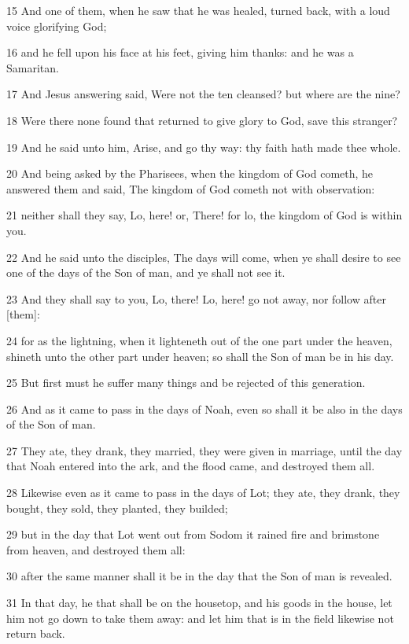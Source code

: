 \par 15 And one of them, when he saw that he was healed, turned back, with a loud voice glorifying God;
\par 16 and he fell upon his face at his feet, giving him thanks: and he was a Samaritan.
\par 17 And Jesus answering said, Were not the ten cleansed? but where are the nine?
\par 18 Were there none found that returned to give glory to God, save this stranger?
\par 19 And he said unto him, Arise, and go thy way: thy faith hath made thee whole.
\par 20 And being asked by the Pharisees, when the kingdom of God cometh, he answered them and said, The kingdom of God cometh not with observation:
\par 21 neither shall they say, Lo, here! or, There! for lo, the kingdom of God is within you.
\par 22 And he said unto the disciples, The days will come, when ye shall desire to see one of the days of the Son of man, and ye shall not see it.
\par 23 And they shall say to you, Lo, there! Lo, here! go not away, nor follow after [them]:
\par 24 for as the lightning, when it lighteneth out of the one part under the heaven, shineth unto the other part under heaven; so shall the Son of man be in his day.
\par 25 But first must he suffer many things and be rejected of this generation.
\par 26 And as it came to pass in the days of Noah, even so shall it be also in the days of the Son of man.
\par 27 They ate, they drank, they married, they were given in marriage, until the day that Noah entered into the ark, and the flood came, and destroyed them all.
\par 28 Likewise even as it came to pass in the days of Lot; they ate, they drank, they bought, they sold, they planted, they builded;
\par 29 but in the day that Lot went out from Sodom it rained fire and brimstone from heaven, and destroyed them all:
\par 30 after the same manner shall it be in the day that the Son of man is revealed.
\par 31 In that day, he that shall be on the housetop, and his goods in the house, let him not go down to take them away: and let him that is in the field likewise not return back.
